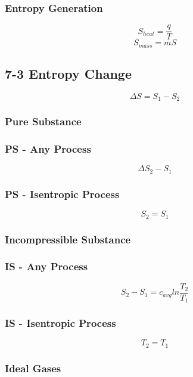 \documentclass[10pt,landscape]{article}
\begin{document}
\begin{multicols}{3}
\subsubsection{Entropy Generation}
\begin{equation}
    S_{heat}=\frac{q}{T}
\end{equation}
\begin{equation}
    S_{mass}=mS
\end{equation}
\subsection{7-3 Entropy Change}
\begin{equation}
    \Delta S = S_1-S_2
\end{equation}
\subsubsection{Pure Substance}
\subsubsection{PS - Any Process}
\begin{equation}
    \Delta S_2-S_1
\end{equation}
\subsubsection{PS - Isentropic Process}
\begin{equation}
    S_2=S_1
\end{equation}
\subsubsection{Incompressible Substance}
\subsubsection{IS - Any Process}
\begin{equation}
    S_2-S_1=c_{avg}ln\frac{T_2}{T_1}
\end{equation}
\subsubsection{IS - Isentropic Process}
\begin{equation}
    T_2=T_1
\end{equation}
\subsubsection{Ideal Gases}

\end{multicols}
\end{document}
